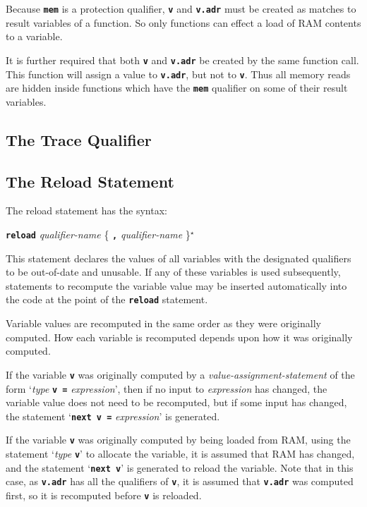 \documentclass[12pt]{article}
\makeatletter
\newcommand{\TT}[1]{{\tt \bfseries #1}}
\newcommand{\ttkey}[1]{\TT{#1}\index{#1@{\tt #1}}}
\newcommand{\STAR}{{\Large $^\star$}}
\makeatother
\begin{document}
Because \TT{mem} is a protection qualifier, \TT{v} and \TT{v.adr}
must be created as matches to result variables of a function.
So only functions can effect a load of RAM contents to a variable.

It is further required that both \TT{v} and \TT{v.adr} be created
by the same function call.  This function will assign a value to
\TT{v.adr}, but not to \TT{v}.  Thus all memory reads are hidden
inside functions which have the \TT{mem} qualifier on some of
their result variables.


\subsection{The Trace Qualifier}
\label{THE-TRACE-QUALIFIER}

\subsection{The Reload Statement}
\label{THE-RELOAD-COMMAND}

The reload statement has the syntax:
\begin{center}
\ttkey{reload} {\em qualifier-name} \{ \TT{,} {\em qualifier-name} \}\STAR{}
\end{center}

This statement declares the values of all variables with the designated
qualifiers to be out-of-date and unusable.  If any of these variables
is used subsequently, statements to recompute the variable value
may be inserted automatically into the code at the point of the
\TT{reload} statement.

Variable values are recomputed in the same order as they were
originally computed.  How each variable is recomputed depends upon
how it was originally computed.

If the variable \TT{v} was originally computed by
a {\em value-assignment-statement}
of the form `{\em type} \TT{v =} {\em expression}', then if
no input to {\em expression} has changed, the variable value does not
need to be recomputed, but if some input has changed, the
statement `\TT{next v =} {\em expression}' is generated.

If the variable \TT{v} was originally computed by being loaded from
RAM, using the statement `{\em type} \TT{v}' to allocate the variable,
it is assumed that RAM has changed, and the statement `\TT{next v}' is
generated to reload the variable.  Note that in this case, as \TT{v.adr}
has all the qualifiers of \TT{v}, it is assumed that \TT{v.adr} was
computed first, so it is recomputed before \TT{v} is reloaded.
\end{document}
